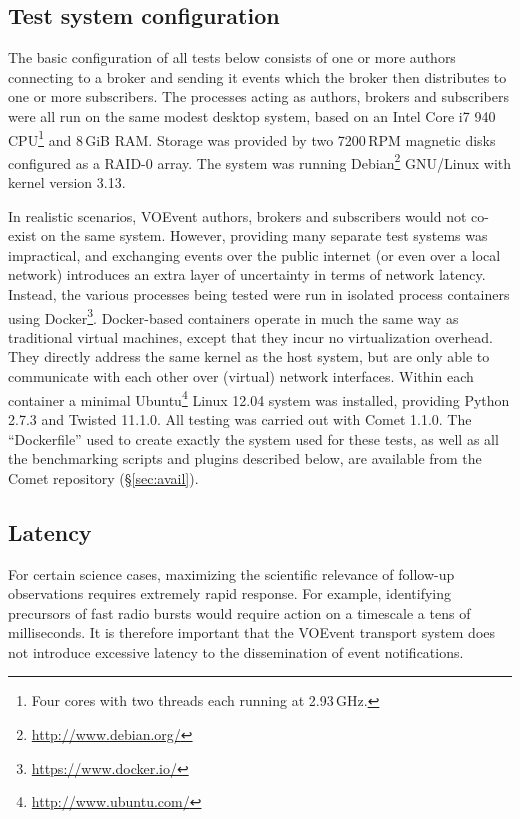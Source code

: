 \documentclass[5p,authoryear]{elsarticle}
\begin{document}
\subsection{Test system configuration}
\label{sec:perf:system}

The basic configuration of all tests below consists of one or more authors
connecting to a broker and sending it events which the broker then distributes
to one or more subscribers. The processes acting as authors, brokers and
subscribers were all run on the same modest desktop system, based on an Intel
Core i7 940 CPU\footnote{Four cores with two threads each running at
2.93\,GHz.} and 8\,GiB RAM. Storage was provided by two 7200\,RPM magnetic
disks configured as a RAID-0 array. The system was running
Debian\footnote{\url{http://www.debian.org/}} GNU/Linux with kernel version
3.13.

In realistic scenarios, VOEvent authors, brokers and subscribers would not
co-exist on the same system. However, providing many separate test systems was
impractical, and exchanging events over the public internet (or even over a
local network) introduces an extra layer of uncertainty in terms of network
latency. Instead, the various processes being tested were run in isolated
process containers using Docker\footnote{\url{https://www.docker.io/}}.
Docker-based containers operate in much the same way as traditional virtual
machines, except that they incur no virtualization overhead. They directly
address the same kernel as the host system, but are only able to communicate
with each other over (virtual) network interfaces. Within each container a
minimal Ubuntu\footnote{\url{http://www.ubuntu.com/}} Linux 12.04 system was
installed, providing Python 2.7.3 and Twisted 11.1.0. All testing was carried
out with Comet 1.1.0. The ``Dockerfile'' used to create exactly the system
used for these tests, as well as all the benchmarking scripts and plugins
described below, are available from the Comet repository (\S\ref{sec:avail}).

\subsection{Latency}
\label{sec:perf:latency}

For certain science cases, maximizing the scientific relevance of follow-up
observations requires extremely rapid response. For example, identifying
precursors of fast radio bursts \citep{Thornton:2013} would require action on
a timescale a tens of milliseconds. It is therefore important that the VOEvent
transport system does not introduce excessive latency to the dissemination of
event notifications.
\end{document}
